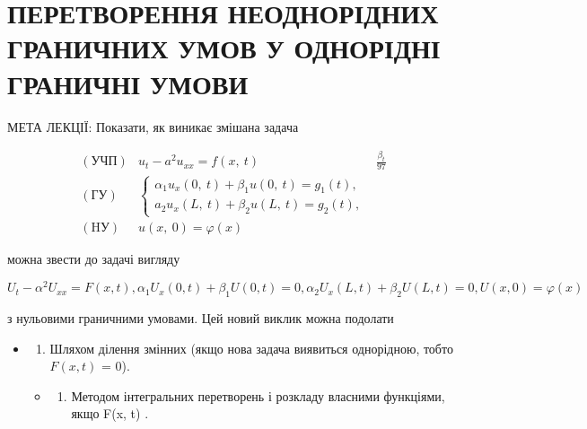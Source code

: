\documentclass[
  ukrainian,
]{article}
\providecommand{\tightlist}{%
  \setlength{\itemsep}{0pt}\setlength{\parskip}{0pt}}
\begin{document}
\section{ПЕРЕТВОРЕННЯ НЕОДНОРІДНИХ ГРАНИЧНИХ УМОВ У ОДНОРІДНІ ГРАНИЧНІ
УМОВИ}\label{ux43fux435ux440ux435ux442ux432ux43eux440ux435ux43dux43dux44f-ux43dux435ux43eux434ux43dux43eux440ux456ux434ux43dux438ux445-ux433ux440ux430ux43dux438ux447ux43dux438ux445-ux443ux43cux43eux432-ux443-ux43eux434ux43dux43eux440ux456ux434ux43dux456-ux433ux440ux430ux43dux438ux447ux43dux456-ux443ux43cux43eux432ux438}

МЕТА ЛЕКЦІЇ: Показати, як виникає змішана задача

\[
\begin{array}{lll} (\text{УЧП}) & u_t - a^2 u_{xx} = f\left(x, \ t\right) & \frac{\beta_t}{97} \\ (\text{ГУ}) & \begin{cases} \alpha_1 u_x\left(0, \ t\right) + \beta_1 u\left(0, \ t\right) = g_1\left(t\right), \\ a_2 u_x\left(L, \ t\right) + \beta_2 u\left(L, \ t\right) = g_2\left(t\right), \end{cases} \\ (\text{HУ}) & u\left(x, \ 0\right) = \varphi\left(x\right) \end{array}
\]

можна звести до задачі вигляду

\[
U_{t} - \alpha^{2}U_{xx} = F(x, t),
\alpha_{1}U_{x}(0, t) + \beta_{1}U(0, t) = 0,
\alpha_{2}U_{x}(L, t) + \beta_{2}U(L, t) = 0,
U(x, 0) = \varphi(x)
\]

з нульовими граничними умовами. Цей новий виклик можна подолати

\begin{itemize}
\item
  \begin{enumerate}
  \def\labelenumi{\arabic{enumi}.}
  \tightlist
  \item
    Шляхом ділення змінних (якщо нова задача виявиться однорідною, тобто
    \(F(x, t)\) = 0).
  \end{enumerate}

  \begin{itemize}
  \tightlist
  \item
    \begin{enumerate}
    \def\labelenumi{\arabic{enumi}.}
    \setcounter{enumi}{1}
    \tightlist
    \item
      Методом інтегральних перетворень і розкладу власними функціями,
      якщо F(x, t)  .
    \end{enumerate}
  \end{itemize}
\end{itemize}
\end{document}
